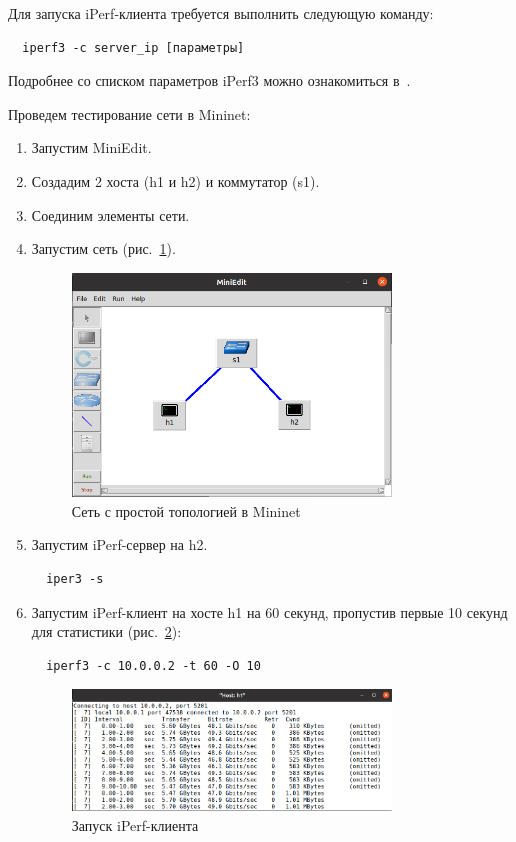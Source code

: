 Для запуска iPerf-клиента требуется выполнить следующую команду:
\begin{verbatim}
  iperf3 -c server_ip [параметры]
\end{verbatim}

Подробнее со списком параметров iPerf3 можно ознакомиться
в~\cite{iperf_userdoc}.

Проведем тестирование сети в Mininet:
\begin{enumerate}
\item Запустим MiniEdit.
\item Создадим 2 хоста (h1 и h2) и коммутатор (s1).
\item Соединим элементы сети.
\item Запустим сеть (рис.~\ref{fig:0011}).


\begin{figure}[!h]
\centering
\includegraphics[width=0.8\textwidth]{image/iperf_1.png}
\caption{Сеть с простой топологией в Mininet}
\label{fig:0011}
\end{figure}

\item Запустим iPerf-сервер на h2.
\begin{verbatim}
  iper3 -s
\end{verbatim}

\item Запустим iPerf-клиент на хосте h1 на 60 секунд, пропустив первые
  10 секунд для статистики (рис.~\ref{fig:0012}):
\begin{verbatim}
  iperf3 -c 10.0.0.2 -t 60 -O 10
\end{verbatim}

\begin{figure}[!h]
\centering
\includegraphics[width=0.8\textwidth]{image/iperf_3.png}
\caption{Запуск iPerf-клиента}
\label{fig:0012}
\end{figure}



\end{enumerate}

